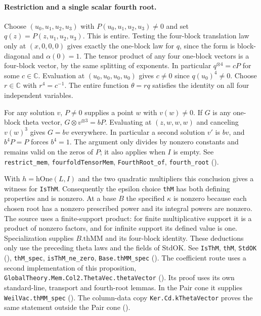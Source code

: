 \paragraph{Restriction and a single scalar fourth root.}
\label{r16:ktheta-root}
Choose $(u_0,u_1,u_2,u_3)$ with $P(u_0,u_1,u_2,u_3)\ne0$ and set
$q(z)=P(z,u_1,u_2,u_3)$. This is entire. Testing the four-block
translation law only at $(x,0,0,0)$ gives exactly the one-block law
for $q$, since the form is block-diagonal and $\alpha(0)=1$.
The tensor product of any four one-block vectors is a four-block
vector, by the same splitting of exponents. In particular
$q^{\otimes4}=cP$ for some $c\in\mathbb C$. Evaluation at
$(u_0,u_0,u_0,u_0)$ gives $c\ne0$ since $q(u_0)^4\ne0$.
Choose $r\in\mathbb C$ with $r^4=c^{-1}$. The entire function
$\theta=rq$ satisfies the identity on all four independent variables.

For any solution $v$, $P\ne0$ supplies a point $w$ with $v(w)\ne0$.
If $G$ is any one-block theta vector, $G\otimes v^{\otimes3}=bP$.
Evaluating at $(z,w,w,w)$ and canceling $v(w)^3$ gives $G=bv$
everywhere. In particular a second solution $v'$ is $bv$, and
$b^4P=P$ forces $b^4=1$. The argument only divides by nonzero
constants and remains valid on the zeros of $P$; it also applies when
$I$ is empty. See \nolinkurl{restrict_mem}, \nolinkurl{fourfoldTensorMem},
\nolinkurl{FourthRoot_of}, \nolinkurl{fourth_root}
().

With $h=\mathrm{hOne}(L,I)$ and the two quadratic multipliers this
conclusion gives a witness for \nolinkurl{IsThM}. Consequently the
epsilon choice \nolinkurl{thM} has both defining properties and is
nonzero. At a base $B$ the specified $\kappa$ is nonzero because each
chosen root has a nonzero prescribed power and its integral powers
are nonzero. The source uses a finite-support product: for finite multiplicative support it is a product of nonzero factors, and for infinite support its defined value is one. Specialization supplies $B.\mathrm{thMM}$ and its
four-block identity. These deductions only use the preceding theta
laws and the fields of $\mathrm{StdOK}$.
See \nolinkurl{IsThM}, \nolinkurl{thM}, \nolinkurl{StdOK}
(),
\nolinkurl{thM_spec}, \nolinkurl{isThM_ne_zero}, \nolinkurl{Base.thMM_spec}
().
The coefficient route uses a second implementation of this proposition,
\nolinkurl{GlobalTheory.Mem.Col2.ThetaVec.thetaVector}
().
Its proof uses its own standard-line, transport and fourth-root lemmas.
In the Pair cone it supplies \nolinkurl{WeilVac.thMM_spec}
().
The column-data copy \nolinkurl{Ker.Cd.kThetaVector} proves the same
statement outside the Pair cone
().

